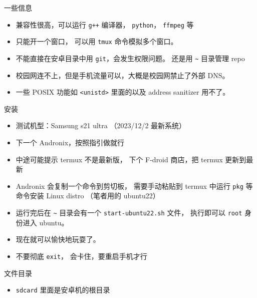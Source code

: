 
一些信息
\begin{itemize}
\item 兼容性很高，可以运行 \verb`g++` 编译器， \verb`python`， \verb`ffmpeg` 等
\item 只能开一个窗口， 可以用 \verb`tmux` 命令模拟多个窗口。
\item 不能直接在安卓目录中用 \verb`git`，会发生权限问题。 还是用 \verb`~` 目录管理 repo
\item 校园网连不上，但是手机流量可以，大概是校园网禁止了外部 DNS。
\item 一些 POSIX 功能如 \verb`<unistd>` 里面的以及 address sanitizer 用不了。
\end{itemize}

安装
\begin{itemize}
\item 测试机型：Samsung s21 ultra （2023/12/2 最新系统）
\item 下一个 Andronix，按照指引做就行
\item 中途可能提示 termux 不是最新版， 下个 F-droid 商店，把 termux 更新到最新
\item Andronix 会复制一个命令到剪切板， 需要手动粘贴到 termux 中运行 \verb`pkg` 等命令安装 Linux distro （笔者用的 ubuntu22）
\item 运行完后在 \verb`~` 目录会有一个 \verb`start-ubuntu22.sh` 文件， 执行即可以 \verb`root` 身份进入 ubuntu。
\item 现在就可以愉快地玩耍了。
\item 不要彻底 \verb`exit`， 会卡住，要重启手机才行
\end{itemize}


文件目录
\begin{itemize}
\item \verb`sdcard` 里面是安卓机的根目录
\end{itemize}

